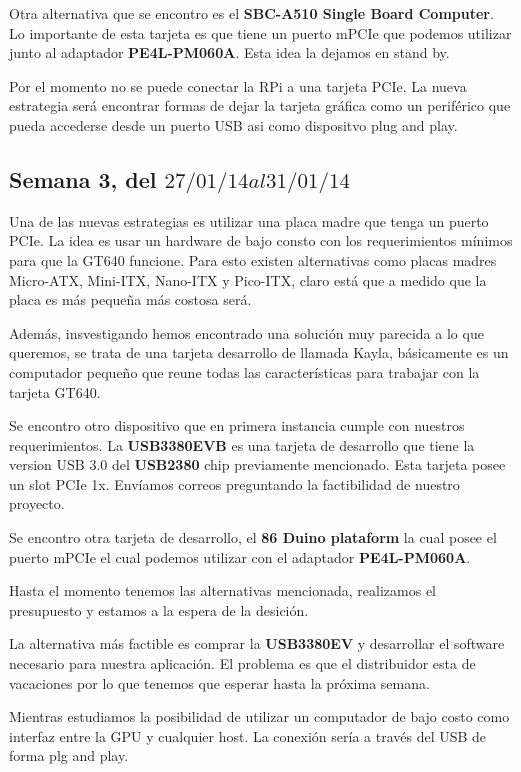 \documentclass[11pt,oneside,titlepage]{article}
\begin{document}
Otra alternativa que se encontro es el \textbf{SBC-A510 Single Board Computer}. Lo
importante de esta tarjeta es que tiene un puerto mPCIe que podemos utilizar junto
al adaptador \textbf{PE4L-PM060A}. Esta idea la dejamos en stand by.

Por el momento no se puede conectar la RPi a una tarjeta PCIe. La nueva estrategia
será encontrar formas de dejar la tarjeta gráfica como un periférico que pueda
accederse desde un puerto USB asi como dispositvo plug and play.

\subsection*{Semana 3, del $27/01/14 al 31/01/14$}

Una de las nuevas estrategias es utilizar una placa madre que tenga un puerto
PCIe. La idea es usar un hardware de bajo consto con los requerimientos mínimos
para que la GT640 funcione. Para esto existen alternativas como placas madres
Micro-ATX, Mini-ITX, Nano-ITX y Pico-ITX, claro está que a medido que la placa
es más pequeña más costosa será. 

Además, insvestigando hemos encontrado una solución muy parecida a lo que
queremos, se trata de una tarjeta desarrollo de llamada Kayla, básicamente es
un computador pequeño que reune todas las características para trabajar con la
tarjeta GT640.  

Se encontro otro dispositivo que en primera instancia cumple con nuestros
requerimientos. La \textbf{USB3380EVB} es una tarjeta de desarrollo que tiene la
version USB 3.0 del \textbf{USB2380} chip previamente mencionado. Esta tarjeta
posee un slot PCIe 1x. Envíamos correos preguntando la factibilidad de nuestro
proyecto.

Se encontro otra tarjeta de desarrollo, el \textbf{86 Duino plataform} la cual
posee el puerto mPCIe el cual podemos utilizar con el adaptador
\textbf{PE4L-PM060A}.

Hasta el momento tenemos las alternativas mencionada, realizamos el presupuesto y
estamos a la espera de la desición.

La alternativa más factible es comprar la \textbf{USB3380EV} y desarrollar el
software necesario para nuestra aplicación. El problema es que el distribuidor
esta de vacaciones por lo que tenemos que esperar hasta la próxima semana.

Mientras estudiamos la posibilidad de utilizar un computador de bajo costo como
interfaz entre la GPU y cualquier host. La conexión sería a trav\'es del USB de
forma plg and play.
\end{document}
